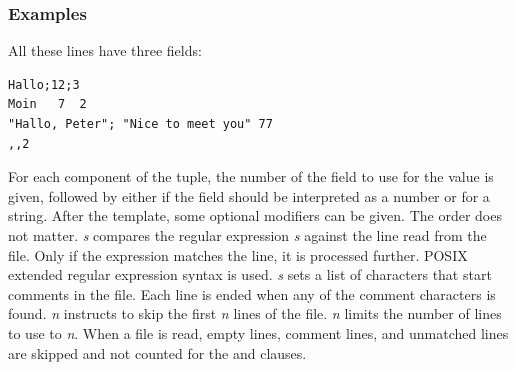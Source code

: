 \subsubsection{Examples}
All these lines have three fields:
{\small
\begin{verbatim}
Hallo;12;3
Moin   7  2
"Hallo, Peter"; "Nice to meet you" 77
,,2
\end{verbatim}
}

\noindent For each component of the tuple, the number of the field
to use for the value is given, followed by either  if the
field should be interpreted as a number or  for a string.
After the template, some optional modifiers can be given. The order
does not matter.
 \emph{s} compares the regular expression \emph{s} against
the line read from the file. Only if the expression matches the
line, it is processed further. POSIX extended regular expression syntax
is used.
 \emph{s} sets a list of characters that start
comments in the file. Each line is ended when any of the comment
characters is found.
 \emph{n} instructs to skip the first
\emph{n} lines of the file.
 \emph{n} limits the number of
lines to use to \emph{n}.
When a file is read, empty lines, comment lines, and unmatched lines
are skipped and not counted for the  and  clauses.

